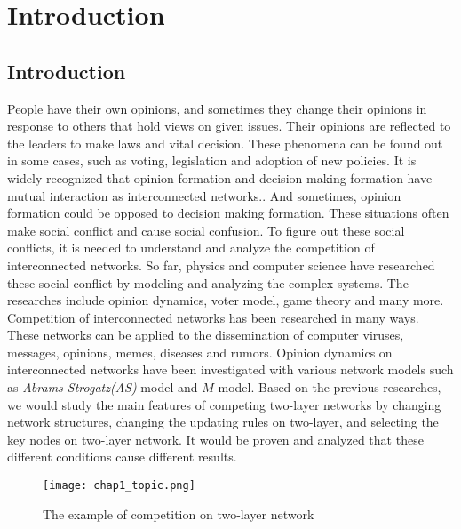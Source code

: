 
\chapter{Introduction}
\label{chap1}
\section{Introduction}
People have their own opinions, and sometimes they change their opinions in response to others that hold views on given issues. Their opinions are reflected to the leaders to make laws and vital decision. These phenomena can be found out in some cases, such as voting, legislation and adoption of new policies. It is widely recognized that opinion formation and decision making formation have mutual interaction as interconnected networks.\parencite{mikko2014, danziger2019, newman2010, boccaletti2014, domenico2013, tomasini2015, namkhanhvu2017}. And sometimes, opinion formation could be opposed to decision making formation. These situations often make social conflict and cause social confusion. To figure out these social conflicts, it is needed to understand and analyze the competition of interconnected networks. So far, physics and computer science have researched these social conflict by modeling and analyzing the complex systems\parencite{fangwu2004, zuev2012, laguna2004, masuda2014}. The researches include opinion dynamics, voter model, game theory and many more.\parencite{smyrnakis2019, bianconi2018, redner2017, haibo2017, amato2017, quattrociocchi2014, casey2009} 
Competition of interconnected networks has been researched in many ways. These networks can be applied to the dissemination of computer viruses, messages, opinions, memes, diseases and rumors\parencite{hua2014,shenyu2018, zhou2018, alvarez2016,gomez2015,diep2017,rocca2014,velasquez2018}. Opinion dynamics on interconnected networks have been investigated with various network models such as \textit{Abrams-Strogatz(AS)} model\parencite{abrams2003,vazquez2010} and $M$ model\parencite{rocca2014}.  Based on the previous researches, we would study the main features of competing two-layer networks by changing network structures, changing the updating rules on two-layer, and selecting the key nodes on two-layer network. It would be proven and analyzed that these different conditions cause different results.
\begin{figure}[!htb]
	\centering
	\texttt{[image: chap1\_topic.png]}
	\caption{The example of competition on two-layer network}
	\label{chap1_topic}
\end{figure}

